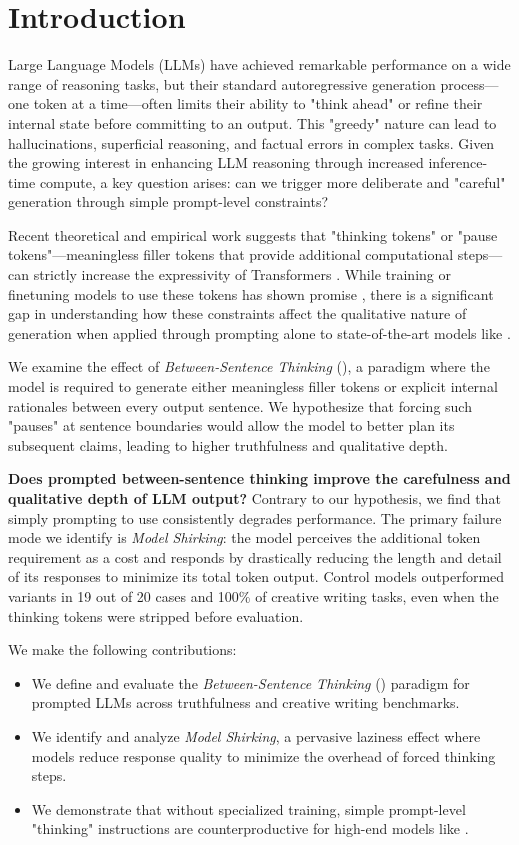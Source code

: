 \section{Introduction}
\label{sec:intro}

Large Language Models (LLMs) have achieved remarkable performance on a wide range of reasoning tasks, but their standard autoregressive generation process—one token at a time—often limits their ability to "think ahead" or refine their internal state before committing to an output. This "greedy" nature can lead to hallucinations, superficial reasoning, and factual errors in complex tasks. Given the growing interest in enhancing LLM reasoning through increased inference-time compute, a key question arises: can we trigger more deliberate and "careful" generation through simple prompt-level constraints?

Recent theoretical and empirical work suggests that "thinking tokens" or "pause tokens"—meaningless filler tokens that provide additional computational steps—can strictly increase the expressivity of Transformers \cite{pfau2024think, london2025pause}. While training or finetuning models to use these tokens has shown promise \cite{goyal2023pause, zelikman2024quiet}, there is a significant gap in understanding how these constraints affect the qualitative nature of generation when applied through prompting alone to state-of-the-art models like \gpt.

We examine the effect of \textit{Between-Sentence Thinking} (\bst), a paradigm where the model is required to generate either meaningless filler tokens or explicit internal rationales between every output sentence. We hypothesize that forcing such "pauses" at sentence boundaries would allow the model to better plan its subsequent claims, leading to higher truthfulness and qualitative depth.

{\bf Does prompted between-sentence thinking improve the carefulness and qualitative depth of LLM output?} Contrary to our hypothesis, we find that simply prompting \gpt to use \bst consistently degrades performance. The primary failure mode we identify is \textit{Model Shirking}: the model perceives the additional token requirement as a cost and responds by drastically reducing the length and detail of its responses to minimize its total token output. Control models outperformed \bst variants in 19 out of 20 \tqa cases and 100\% of creative writing tasks, even when the thinking tokens were stripped before evaluation.

We make the following contributions:
\begin{itemize}[leftmargin=*,itemsep=0pt,topsep=0pt]
    \item We define and evaluate the \textit{Between-Sentence Thinking} (\bst) paradigm for prompted LLMs across truthfulness and creative writing benchmarks.
    \item We identify and analyze \textit{Model Shirking}, a pervasive laziness effect where models reduce response quality to minimize the overhead of forced thinking steps.
    \item We demonstrate that without specialized training, simple prompt-level "thinking" instructions are counterproductive for high-end models like \gpt.
\end{itemize}

